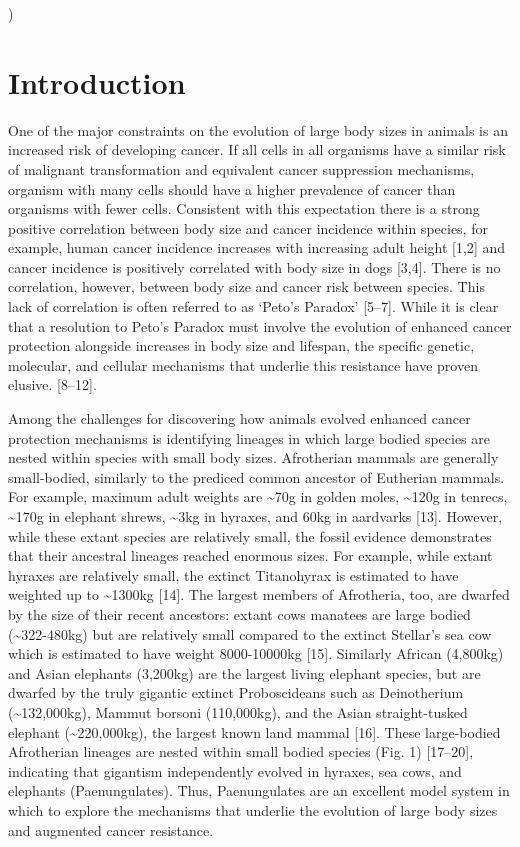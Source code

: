 \documentclass[]{elsarticle} %
\begin{document}
)

\hypertarget{introduction}{%
\section{Introduction}\label{introduction}}

One of the major constraints on the evolution of large body sizes in
animals is an increased risk of developing cancer. If all cells in all
organisms have a similar risk of malignant transformation and equivalent
cancer suppression mechanisms, organism with many cells should have a
higher prevalence of cancer than organisms with fewer cells. Consistent
with this expectation there is a strong positive correlation between
body size and cancer incidence within species, for example, human cancer
incidence increases with increasing adult height {[}1,2{]} and cancer
incidence is positively correlated with body size in dogs {[}3,4{]}.
There is no correlation, however, between body size and cancer risk
between species. This lack of correlation is often referred to as
`Peto's Paradox' {[}5--7{]}. While it is clear that a resolution to
Peto's Paradox must involve the evolution of enhanced cancer protection
alongside increases in body size and lifespan, the specific genetic,
molecular, and cellular mechanisms that underlie this resistance have
proven elusive. {[}8--12{]}.

Among the challenges for discovering how animals evolved enhanced cancer
protection mechanisms is identifying lineages in which large bodied
species are nested within species with small body sizes. Afrotherian
mammals are generally small-bodied, similarly to the prediced common
ancestor of Eutherian mammals. For example, maximum adult weights are
\textasciitilde{}70g in golden moles, \textasciitilde{}120g in tenrecs,
\textasciitilde{}170g in elephant shrews, \textasciitilde{}3kg in
hyraxes, and 60kg in aardvarks {[}13{]}. However, while these extant
species are relatively small, the fossil evidence demonstrates that
their ancestral lineages reached enormous sizes. For example, while
extant hyraxes are relatively small, the extinct Titanohyrax is
estimated to have weighted up to \textasciitilde{}1300kg {[}14{]}. The
largest members of Afrotheria, too, are dwarfed by the size of their
recent ancestors: extant cows manatees are large bodied
(\textasciitilde{}322-480kg) but are relatively small compared to the
extinct Stellar's sea cow which is estimated to have weight 8000-10000kg
{[}15{]}. Similarly African (4,800kg) and Asian elephants (3,200kg) are
the largest living elephant species, but are dwarfed by the truly
gigantic extinct Proboscideans such as Deinotherium
(\textasciitilde{}132,000kg), Mammut borsoni (110,000kg), and the Asian
straight-tusked elephant (\textasciitilde{}220,000kg), the largest known
land mammal {[}16{]}. These large-bodied Afrotherian lineages are nested
within small bodied species (Fig. 1) {[}17--20{]}, indicating that
gigantism independently evolved in hyraxes, sea cows, and elephants
(Paenungulates). Thus, Paenungulates are an excellent model system in
which to explore the mechanisms that underlie the evolution of large
body sizes and augmented cancer resistance.
\end{document}
